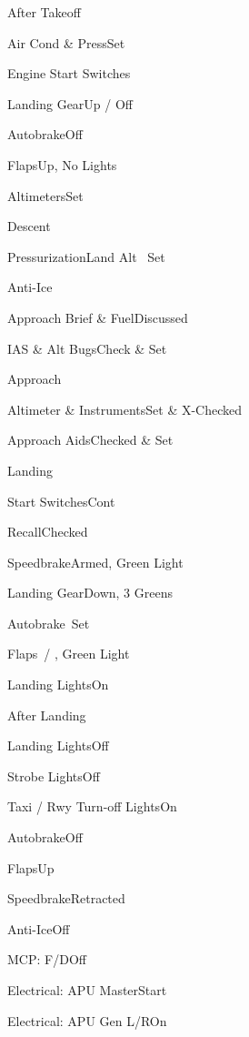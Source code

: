 \documentclass[sim-use, blue_items, halfpage]{checklist}
\begin{document}
\begin{checklist}{After Takeoff}
  \item{Air Cond \& Press}{Set}
  \item{Engine Start Switches}{\blank}
  \item{Landing Gear}{Up / Off}
  \item{Autobrake}{Off}
  \item{Flaps}{Up, No Lights}
  \item{Altimeters}{Set}
\end{checklist}

\begin{checklist}{Descent}
  \item{Pressurization}{Land Alt \blank\ Set}
  \item{Anti-Ice}{\blank}
  \item{Approach Brief \& Fuel}{Discussed}
  \item{IAS \& Alt Bugs}{Check \& Set}
\end{checklist}

\begin{checklist}{Approach}
  \item{Altimeter \& Instruments}{Set \& X-Checked}
  \item{Approach Aids}{Checked \& Set}
\end{checklist}

\begin{checklist}{Landing}
  \item{Start Switches}{Cont}
  \item{Recall}{Checked}
  \item{Speedbrake}{Armed, Green Light}
  \item{Landing Gear}{Down, 3 Greens}
  \item{Autobrake}{\blank\ Set}
  \item{Flaps}{\blank\ / \blank, Green Light}
  \item{Landing Lights}{On}
\end{checklist}

\begin{checklist}{After Landing}
  \item{Landing Lights}{Off}
  \item{Strobe Lights}{Off}
  \item{Taxi / Rwy Turn-off Lights}{On}
  \item{Autobrake}{Off}
  \item{Flaps}{Up}
  \item{Speedbrake}{Retracted}
  \item{Anti-Ice}{Off}
  \item{MCP: F/D}{Off}
  \item{Electrical: APU Master}{Start}
  \item{Electrical: APU Gen L/R}{On}
\end{checklist}
\end{document}
